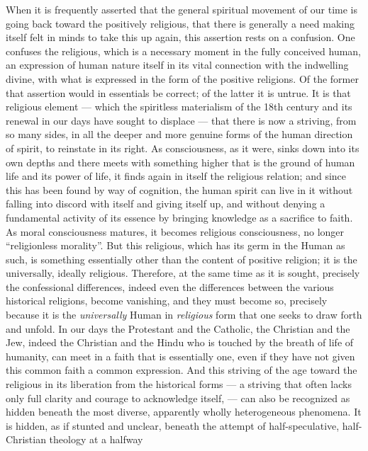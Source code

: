 \documentclass[12pt,a4paper,openany]{book}
\newcommand{\opage}[1]{\marginnote{\footnotesize\textit{[#1]}}}
\begin{document}
When it is frequently asserted that the general spiritual
movement of our time is going back toward the positively
religious, that there is generally a need making itself felt
in minds to take this up again, this assertion rests
on a confusion. One confuses the religious,
which is a necessary moment in the fully conceived
human, an expression of human nature itself in
its vital connection with the indwelling divine, with
what is expressed in the form of the positive religions. Of the former
that assertion would in essentials be correct; of the latter
it is untrue. It is that religious element --- which the
spiritless materialism of the 18th century and its renewal
in our days have sought to displace --- that there is now a striving, from so
many sides, in all the deeper and more genuine forms of the
human direction of spirit, to reinstate in its right. As
consciousness, as it were, sinks down into its own depths and there
meets with something higher that is the ground of human life and its
\opage{296}power of life, it finds again in itself the religious relation; and since
this has been found by way of cognition, the human spirit can
live in it without falling into discord with itself and giving
itself up, and without denying a fundamental activity of its
essence by bringing knowledge as a sacrifice to faith. As
moral consciousness matures, it becomes religious consciousness,
no longer ``religionless morality''. But this religious,
which has its germ in the Human as such, is something
essentially other than the content of positive religion; it is
the universally, ideally religious. Therefore, at the same time as
it is sought, precisely the confessional differences, indeed even the differences
between the various historical religions, become vanishing,
and they must become so, precisely because it is the \emph{universally}
Human in \emph{religious} form that one seeks to draw forth and unfold.
In our days the Protestant and the Catholic, the
Christian and the Jew, indeed the Christian and the Hindu who is touched
by the breath of life of humanity, can meet in a faith that is essentially
one, even if they have not given this common faith a
common expression. And this striving of the age toward the
religious in its liberation from the historical forms --- a
striving that often lacks only full clarity and courage to
acknowledge itself, --- can also be recognized as hidden
beneath the most diverse, apparently wholly heterogeneous phenomena.
It is hidden, as if stunted and unclear, beneath the
attempt of half-speculative, half-Christian theology at a halfway
\end{document}

